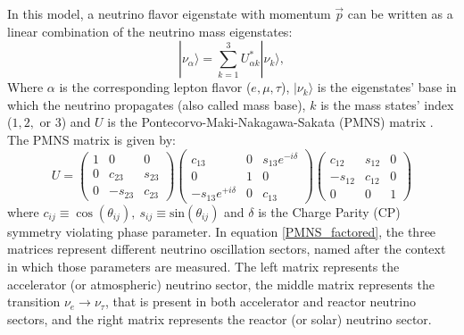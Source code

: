 In this model, a neutrino flavor eigenstate with momentum $\vec{p}$ can be written as a linear combination of the neutrino mass eigenstates:
%
\begin{equation}
	|\nu_\alpha \rangle = \sum_{k=1}^3 U^*_{\alpha k} |\nu_k \rangle,
	\label{nu_state}
\end{equation}
%
Where $\alpha$ is the corresponding lepton flavor ($e, \mu, \tau$), $|\nu_k\rangle$ is the eigenstates' base in which the neutrino propagates (also called mass base), $k$ is the mass states' index ($1, 2,$ or $3$) and $U$ is the Pontecorvo-Maki-Nakagawa-Sakata (PMNS) matrix \cite{MNS, PMNS}. The PMNS matrix is given by:
%
\begin{equation}
	U = \left( \begin{array}{ccc} 
	1 & 0 & 0 \\ 
	0 & c_{23} & s_{23} \\
	0 & -s_{23} & c_{23} \end{array} \right)
	\left(\begin{array}{ccc} 
	c_{13} & 0 & s_{13}e^{-i\delta} \\ 
	0 & 1 & 0 \\ 
	-s_{13}e^{+i\delta} & 0 & c_{13} \end{array}\right)
	\left(\begin{array}{ccc}
	c_{12} & s_{12} & 0 \\ 
	-s_{12} & c_{12} & 0 \\ 
	0 & 0 & 1 \end{array} \right)
	\label{PMNS_factored}
\end{equation}
%
where $c_{ij} \equiv \cos(\theta_{ij}), \ s_{ij} \equiv \text{sin}(\theta_{ij})$ and $\delta$ is the Charge Parity (CP) symmetry violating phase parameter.
In equation \ref{PMNS_factored}, the three matrices represent different neutrino oscillation sectors, named after the context in which those parameters are measured. The left matrix represents the accelerator (or atmospheric) neutrino sector, the middle matrix represents the transition $\nu_e \rightarrow \nu_\tau$, that is present in both accelerator and reactor neutrino sectors, and the right matrix represents the reactor (or solar) neutrino sector.

